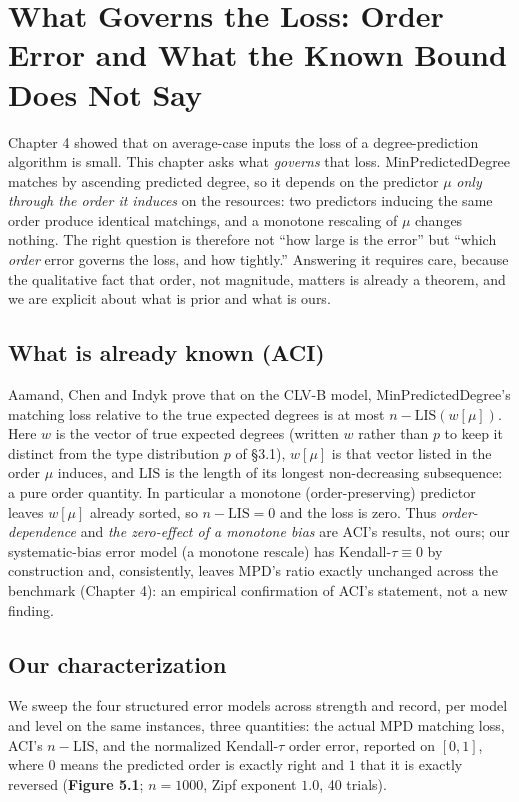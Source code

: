 \chapter{What Governs the Loss: Order Error and What the Known Bound
Does Not
Say}

Chapter 4 showed that on average-case inputs the loss of a
degree-prediction algorithm is small. This chapter asks what
\emph{governs} that loss. MinPredictedDegree matches by ascending
predicted degree, so it depends on the predictor \(\mu\) \emph{only
through the order it induces} on the resources: two predictors inducing
the same order produce identical matchings, and a monotone rescaling of
\(\mu\) changes nothing. The right question is therefore not ``how large
is the error'' but ``which \emph{order} error governs the loss, and how
tightly.'' Answering it requires care, because the qualitative fact that
order, not magnitude, matters is already a theorem, and we are explicit
about what is prior and what is ours.

\section{What is already known (ACI)}

Aamand, Chen and Indyk \autocite[Appendix D]{aci2022mpd} prove that on
the CLV-B model, MinPredictedDegree's matching loss relative to the true
expected degrees is at most \(n-\mathrm{LIS}(w[\mu])\). Here \(w\) is
the vector of true expected degrees (written \(w\) rather than \(p\) to
keep it distinct from the type distribution \(p\) of §3.1), \(w[\mu]\)
is that vector listed in the order \(\mu\) induces, and \(\mathrm{LIS}\)
is the length of its longest non-decreasing subsequence: a pure order
quantity. In particular a monotone (order-preserving) predictor leaves
\(w[\mu]\) already sorted, so \(n-\mathrm{LIS}=0\) and the loss is zero.
Thus \emph{order-dependence} and \emph{the zero-effect of a monotone
bias} are ACI's results, not ours; our systematic-bias error model (a
monotone rescale) has Kendall-\(\tau\equiv0\) by construction and,
consistently, leaves MPD's ratio exactly unchanged across the benchmark
(Chapter 4): an empirical confirmation of ACI's statement, not a new
finding.

\section{Our characterization}

We sweep the four structured error models across strength and record,
per model and level on the same instances, three quantities: the actual
MPD matching loss, ACI's \(n-\mathrm{LIS}\), and the normalized
Kendall-\(\tau\) order error, reported on \([0,1]\), where \(0\) means
the predicted order is exactly right and \(1\) that it is exactly
reversed (\textbf{Figure 5.1}; \(n=1000\), Zipf exponent \(1.0\), 40
trials).

